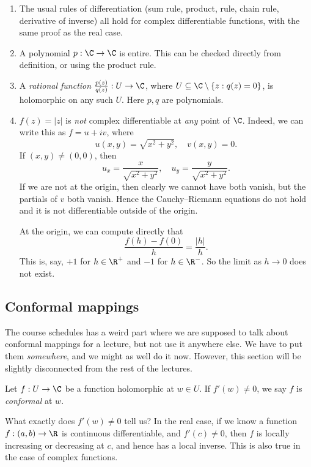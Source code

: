 \documentclass[a4paper]{article}
\begin{document}
\begin{eg}\leavevmode
  \begin{enumerate}
    \item The usual rules of differentiation (sum rule, product, rule, chain rule, derivative of inverse) all hold for complex differentiable functions, with the same proof as the real case.
    \item A polynomial $p: \C \to \C$ is entire. This can be checked directly from definition, or using the product rule.
    \item A \emph{rational function} $\frac{p(z)}{q(z)}: U \to \C$, where $U \subseteq \C \setminus \{z: q(z) = 0\}$, is holomorphic on any such $U$. Here $p, q$ are polynomials.
    \item $f(z) = |z|$ is \emph{not} complex differentiable at \emph{any} point of $\C$. Indeed, we can write this as $f = u + iv$, where
      \[
        u(x, y) = \sqrt{x^2 + y^2},\quad v(x, y) = 0.
      \]
      If $(x, y) \not= (0, 0)$, then
      \[
        u_x = \frac{x}{\sqrt{x^2 + y^2}},\quad u_y = \frac{y}{\sqrt{x^2 + y^2}}.
      \]
      If we are not at the origin, then clearly we cannot have both vanish, but the partials of $v$ both vanish. Hence the Cauchy--Riemann equations do not hold and it is not differentiable outside of the origin.

      At the origin, we can compute directly that
      \[
        \frac{f(h) - f(0)}{h} = \frac{|h|}{h}.
      \]
      This is, say, $+1$ for $h \in \R^+$ and $-1$ for $h \in \R^-$. So the limit as $h \to 0$ does not exist.
  \end{enumerate}
\end{eg}

\subsection{Conformal mappings}
The course schedules has a weird part where we are supposed to talk about conformal mappings for a lecture, but not use it anywhere else. We have to put them \emph{somewhere}, and we might as well do it now. However, this section will be slightly disconnected from the rest of the lectures.

\begin{defi}
  Let $f: U \to \C$ be a function holomorphic at $w \in U$. If $f'(w) \not= 0$, we say $f$ is \emph{conformal} at $w$.
\end{defi}

What exactly does $f'(w) \not= 0$ tell us? In the real case, if we know a function $f: (a, b) \to \R$ is continuous differentiable, and $f'(c) \not= 0$, then $f$ is locally increasing or decreasing at $c$, and hence has a local inverse. This is also true in the case of complex functions.
\end{document}
